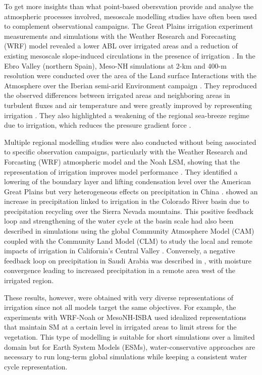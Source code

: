 To get more insights than what point-based obersvation provide and analyse the atmospheric processes involved, mesoscale modelling studies have often been used to complement observational campaigns. 
The Great Plains irrigation experiment \cite[GRAINEX,][]{rappin_great_2021} measurements and simulations with the Weather Research and Forecasting (WRF) model revealed a lower ABL over irrigated areas and a reduction of existing mesoscale slope-induced circulations in the presence of irrigation \citep{rappin_landatmosphere_2022, phillips_influence_2022}. 
In the Ebro Valley (northern Spain), Meso-NH simulations at 2-km and 400-m resolution were conducted over the area of the Land surface Interactions with the Atmosphere over the Iberian semi-arid Environment campaign \citep[LIAISE][]{boone_land_2019}. They reproduced the observed differences between irrigated areas and neighboring areas in turbulent fluxes and air temperature and were greatly improved by representing irrigation \citep{lunel_irrigation_2024}. They also highlighted a weakening of the regional sea-breeze regime due to irrigation, which reduces the pressure gradient force \citep{lunel_marinada_2024}.  

Multiple regional modelling studies were also conducted without being associated to specific observation campaigns, particularly with the Weather Research and Forcasting (WRF) atmospheric model and the Noah LSM, showing that the representation of irrigation improves model performance \citep{qian_modeling_2013, yang_impact_2017, liu_simulating_2021}. They identified a lowering of the boundary layer and lifting condensation level over the American Great Plains \citep{qian_modeling_2013} but very heterogeneous effects on precipitation in China \citep{liu_simulating_2021}. \citet{yang_impact_2017} showed an increase in precipitation linked to irrigation in the Colorado River basin due to precipitation recycling over the Sierra Nevada mountains. This positive feedback loop and strengthening of the water cycle at the basin scale had also been described in simulations using the global Community Atmosphere Model (CAM) coupled with the Community Land Model (CLM) to study the local and remote impacts of irrigation in California's Central Valley \citep{lo_irrigation_2013}. Conversely, a negative feedback loop on precipitation in Saudi Arabia was described in \citep{lo_intense_2021}, with moisture convergence leading to increased precipitation in a remote area west of the irrigated region.

These results, however, were obtained with very diverse representations of irrigation since not all models target the same objectives. For example, the experiments with WRF-Noah or MesoNH-ISBA \citep{lunel_irrigation_2024} used idealized representations that maintain SM at a certain level in irrigated areas to limit stress for the vegetation. This type of modelling is suitable for short simulations over a limited domain but for Earth System Models (ESMs), water-conservative approaches are necessary to run long-term global simulations while keeping a consistent water cycle representation.


